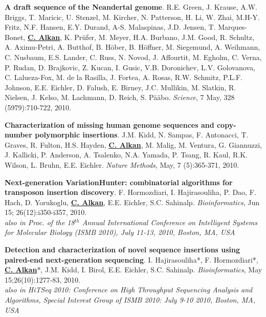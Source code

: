 \documentclass[margin,line]{res}
\begin{document}
\begin{resume}
\vspace{-.2cm}
 {\bf A draft sequence of the Neandertal genome}. R.E. Green, J. Krause, 
A.W. Briggs, T. Maricic, U. Stenzel, M. Kircher, N. Patterson, 
H. Li, W. Zhai, M.H-Y. Fritz, N.F. Hansen, E.Y. Durand, 
A-S. Malaspinas, J.D. Jensen, T. Marques-Bonet, {\bf {\underline {C. Alkan}}}, K. Pr\"{u}fer, M. Meyer, H.A. Burbano, J.M. Good, R. Schultz, A. Aximu-Petri, 
A. Butthof, B. H\"{o}ber, B. H\"{o}ffner, M. Siegemund, A. Weihmann, C.
Nusbaum, E.S. Lander, C. Russ, N. Novod, J. Affourtit, M. Egholm, 
C. Verna, P. Rudan, D. Brajkovic, Z. Kucan, I. Gusic, V.B. 
Doronichev, L.V. Golovanova, C. Lalueza-Fox, M. de la Rasilla, J. Fortea, 
A. Rosas, R.W. Schmitz, P.L.F. Johnson, E.E. Eichler, D. Falush, E. 
Birney, J.C. Mullikin, M. Slatkin, R. Nielsen, J. Kelso, M. Lachmann, 
D. Reich, S. P\"{a}\"{a}bo. {\em Science}, 7 May, 328 (5979):710-722, 2010. \\



\vspace{-.2cm}
{\bf Characterization of missing human genome sequences and
copy-number polymorphic insertions}.
J.M. Kidd, N. Sampas, F. Antonacci, T. Graves, R. Fulton, H.S. Hayden, {\bf {\underline{C. Alkan}}},
 M. Malig, M. Ventura, G. Giannuzzi, J. Kallicki, P. Anderson, A. Tsalenko, 
N.A. Yamada, P. Tsang, R. Kaul, R.K. Wilson, L. Bruhn, E.E. Eichler.
{\em Nature Methods}, May, 7 (5):365-371, 2010.


\vspace{-.2cm}
{\bf Next-generation VariationHunter: combinatorial algorithms for transposon insertion discovery}.
F. Hormozdiari, I. Hajirasouliha, P. Dao, F. Hach, D. Yorukoglu, {\bf {\underline{C. Alkan}}},
 E.E. Eichler, S.C. Sahinalp.
{\em Bioinformatics}, Jun 15; 26(12):i350-i357, 2010. \\
\hspace*{1cm} {\footnotesize {\it also in Proc. of the 18$^{th}$ Annual International Conference on Intelligent Systems
for Molecular Biology (ISMB 2010), July 11-13, 2010, Boston, MA, USA}}


\vspace{-.2cm}
{\bf Detection and characterization of novel sequence insertions using paired-end next-generation sequencing}.
 I. Hajirasouliha*, F. Hormozdiari*, {\bf {\underline{C. Alkan}}}*, J.M. Kidd, I. Birol, E.E. Eichler,
 S.C. Sahinalp.
{\em Bioinformatics}, May 15;26(10):1277-83, 2010. \\
\hspace*{1cm} {\footnotesize {\it also in HiTSeq 2010: Conference on High Throughput Sequencing Analysis and Algorithms, 
    Special Interest Group of ISMB 2010: July 9-10 2010, Boston, MA, USA}}


\end{resume}
\end{document}
